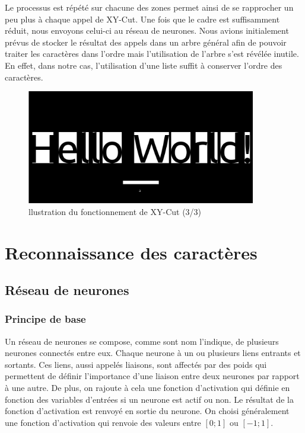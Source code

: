 \documentclass[11pt]{report}
\begin{document}
Le processus est répété sur chacune des zones permet ainsi de se rapprocher un peu plus à chaque appel de XY-Cut. Une fois que le cadre est suffisamment réduit, nous envoyons celui-ci au réseau de neurones. Nous avions initialement prévus de stocker le résultat des appels dans un arbre général afin de pouvoir traiter les caractères dans l'ordre mais l'utilisation de l'arbre s'est révélée inutile. En effet, dans notre cas, l'utilisation d'une liste suffit à conserver l'ordre des caractères.

\begin{figure}[htbp]
\centering
\includegraphics[width=10cm]{3.png}
\caption{llustration du fonctionnement de XY-Cut (3/3)}
\end{figure}

\chapter{Reconnaissance des caractères}

\section{Réseau de neurones}


\subsection{Principe de base}

Un réseau de neurones se compose, comme sont nom l'indique, de plusieurs neurones connectés entre eux. Chaque neurone à un ou plusieurs liens entrants et sortants. Ces liens, aussi appelés liaisons, sont affectés par des poids qui permettent de définir l'importance d'une liaison entre deux neurones par rapport à une autre. De plus, on rajoute à cela une fonction d'activation qui définie en fonction des variables d'entrées si un neurone est actif ou non. Le résultat de la fonction d'activation est renvoyé en sortie du neurone. On choisi généralement une fonction d'activation qui renvoie des valeurs entre $[0; 1]$ ou $[-1; 1]$.
\end{document}

